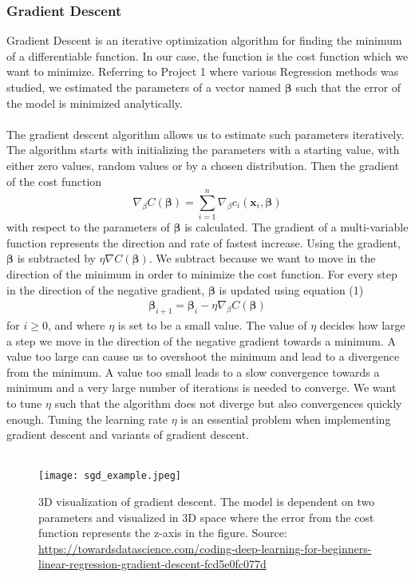 \documentclass[a4paper,twocolumn]{article}
\newcommand{\B}{\boldsymbol{\beta}}
\begin{document}
\subsubsection{Gradient Descent}
Gradient Descent is an iterative optimization algorithm for finding the minimum of a differentiable function. In our case, the function is the cost function which we want to minimize. Referring to Project 1\cite{project1} where various Regression methods was studied, we estimated the parameters of a vector named $\B$ such that the error of the model is minimized analytically.\\
\\
The gradient descent algorithm allows us to estimate such parameters iteratively. The algorithm starts with initializing the parameters with a starting value, with either zero values, random values or by a chosen distribution. Then the gradient of the cost function
$$
\nabla_{\beta} C(\B) = \sum_{i=1}^{n}\nabla_{\beta} c_{i}(\mathbf{x}_{i}, \B)
$$
with respect to the parameters of $\B$ is calculated. The gradient of a multi-variable function represents the direction and rate of fastest increase. Using the gradient, $\B$ is subtracted by $\eta\nabla C(\B)$. We subtract because we want to move in the direction of the minimum in order to minimize the cost function. For every step in the direction of the negative gradient, $\B$ is updated using equation (1)
\begin{align}
    \B_{i + 1} = \B_{i} - \eta \nabla_{\beta} C(\B)
\end{align}
for $i \geq 0$, and where $\eta$ is set to be a small value. The value of $\eta$ decides how large a step we move in the direction of the negative gradient towards a minimum. A value too large can cause us to overshoot the minimum and lead to a divergence from the minimum. A value too small leads to a slow convergence towards a minimum and a very large number of iterations is needed to converge. We want to tune $\eta$ such that the algorithm does not diverge but also convergences quickly enough. Tuning the learning rate $\eta$ is an essential problem when implementing gradient descent and variants of gradient descent.\\
\\
\begin{figure}[ht]
    \centering
    \texttt{[image: sgd\_example.jpeg]}
    \caption{3D visualization of gradient descent. The model is dependent on two parameters and visualized in 3D space where the error from the cost function represents the z-axis in the figure. Source: \href{https://towardsdatascience.com/coding-deep-learning-for-beginners-linear-regression-gradient-descent-fcd5e0fc077d}{https://towardsdatascience.com/coding-deep-learning-for-beginners-linear-regression-gradient-descent-fcd5e0fc077d}}
    \label{fig:1}
\end{figure} \\
\end{document}
